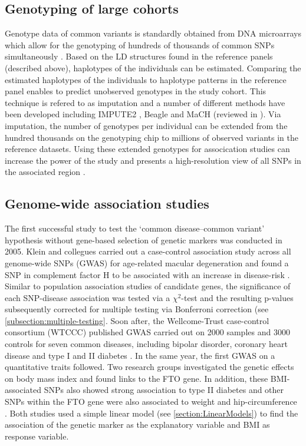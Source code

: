 \subsection{Genotyping of large cohorts}
Genotype data of common variants is standardly obtained from DNA microarrays which allow for the genotyping of hundreds of thousands of common SNPs simultaneously \citep{Wang1998}. 
Based on the LD structures found in the reference panels (described above), haplotypes of the individuals can be estimated. Comparing the estimated haplotypes of the individuals to haplotype patterns in the reference panel enables to predict unobserved genotypes in the study cohort. This technique is refered to as imputation and a number of different methods have been developed including IMPUTE2 \citep{Howie2009}, Beagle \citep{Browning2007} and MaCH \citep{Li2010} (reviewed in \citep{Marchini2010}). Via imputation, the number of genotypes per individual can be extended from the hundred thousands on the genotyping chip to millions of observed variants in the reference datasets. Using these extended genotypes for assocication studies can increase the power of the study and presents a high-resolution view of all SNPs in the associated region \citep{Marchini2010}.

\subsection{Genome-wide association studies}
\label{subsection:GWAS}
The first successful study to test the `common disease–common variant' hypothesis without gene-based selection of genetic markers was conducted in 2005. Klein and collegues carried out a case-control association study across all genome-wide SNPs (GWAS) for age-related macular degeneration and found a SNP in complement factor H to be associated with an increase in disease-risk \citep{Klein2005}. Similar to population association studies of candidate genes, the significance of each SNP-disease association was tested via a \(\chi ^2\)-test and the resulting p-values subsequently corrected for multiple testing via Bonferroni correction (see \cref{subsection:multiple-testing}. Soon after, the Wellcome-Trust case-control consortium (WTCCC) published GWAS carried out on \num{2000} samples and \num{3000} controls for seven common diseases, including bipolar disorder, coronary heart disease and type I and II diabetes \citep{Burton2007}. In the same year, the first GWAS on a quantitative traits followed. Two research groups investigated the genetic effects on body mass index and found links to the FTO gene. In addition, these BMI-associated SNPs also showed strong association to type II diabetes \citep{Frayling2007} and other SNPs within the FTO gene were also associated to weight and hip-circumference \citep{Scuteri2007}. Both studies used a simple linear model  (see \cref{section:LinearModels}) to find the association of the genetic marker as the explanatory variable and BMI as response variable. 


